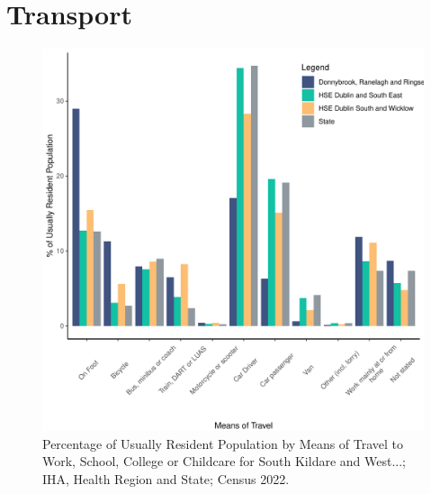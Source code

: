 \documentclass{article}
\begin{document}
\section{Transport}\label{sect:Trans}
\begin{figure}[H]
	\centering
	\includegraphics[width = 120mm]{../figures/TravelED.pdf}
	\caption{Percentage of Usually Resident Population by Means of Travel to Work, School, College or Childcare for South Kildare and West...; IHA, Health Region and State; Census 2022.}
	\label{fig:vbnv}
	\end{figure}
\end{document}
